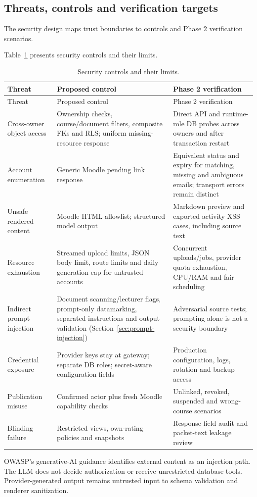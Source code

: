 \subsection{Threats, controls and verification targets}
The security design maps trust boundaries to controls and Phase 2 verification scenarios.
\par
Table~\ref{tab:07-moodle-security-1} presents security controls and their limits.
\begin{longtable}{|p{3.0cm}|p{5.8cm}|p{5.1cm}|}\caption{Security controls and their limits.}\label{tab:07-moodle-security-1}\\\hline
Threat & Proposed control & Phase 2 verification\\\hline\endfirsthead
\hline Threat & Proposed control & Phase 2 verification\\\hline\endhead
Cross-owner object access & Ownership checks, course/document filters, composite FKs and RLS; uniform missing-resource response & Direct API and runtime-role DB probes across owners and after transaction restart\\\hline
Account enumeration & Generic Moodle pending link response & Equivalent status and expiry for matching, missing and ambiguous emails; transport errors remain distinct\\\hline
Unsafe rendered content & Moodle HTML allowlist; structured model output & Markdown preview and exported activity XSS cases, including source text\\\hline
Resource exhaustion & Streamed upload limits, JSON body limit, route limits and daily generation cap for untrusted accounts & Concurrent uploads/jobs, provider quota exhaustion, CPU/RAM and fair scheduling\\\hline
Indirect prompt injection & Document scanning/lecturer flags, prompt-only datamarking, separated instructions and output validation (Section~\ref{sec:prompt-injection}) & Adversarial source tests; prompting alone is not a security boundary\\\hline
Credential exposure & Provider keys stay at gateway; separate DB roles; secret-aware configuration fields & Production configuration, logs, rotation and backup access\\\hline
Publication misuse & Confirmed actor plus fresh Moodle capability checks & Unlinked, revoked, suspended and wrong-course scenarios\\\hline
Blinding failure & Restricted views, own-rating policies and snapshots & Response field audit and packet-text leakage review\\\hline
\end{longtable}
OWASP's generative-AI guidance identifies external content as an injection path\citep{owaspprompt}. The LLM does not decide authorization or receive unrestricted database tools. Provider-generated output remains untrusted input to schema validation and renderer sanitization.

